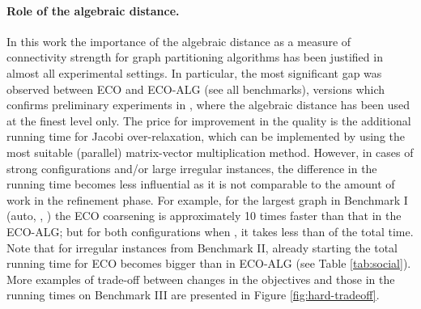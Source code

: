 \documentclass{llncs}
\begin{document}
\paragraph{Role of the algebraic distance.} In this work the importance of the algebraic distance as a measure of connectivity strength for graph partitioning algorithms has been justified in almost all experimental settings. In particular, the most significant gap was observed between ECO and ECO-ALG (see all benchmarks), versions which confirms preliminary experiments in \cite{chen-safro-algdist-full}, where the algebraic distance has been used at the finest level only. The price for improvement in the quality is the additional running time for Jacobi over-relaxation, which can be implemented by using the most suitable (parallel) matrix-vector multiplication method. However, in cases of  strong configurations and/or large irregular instances, the difference in the running time becomes less influential as it is not comparable to the amount of work in the refinement phase. 
For example, for the largest graph in Benchmark I (auto, , ) the ECO coarsening is approximately 10 times faster than that in the ECO-ALG; but for both configurations when , it takes less than  of the total time.
Note that for irregular instances from Benchmark II, already starting  the total running time for ECO becomes bigger than in ECO-ALG (see Table \ref{tab:social}).
More examples of trade-off between changes in the objectives and those in the running times on Benchmark III are presented in Figure \ref{fig:hard-tradeoff}.
\end{document}
